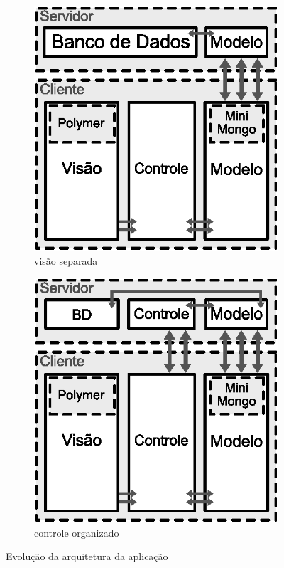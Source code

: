 \begin{figure}[h!]
	\begin{subfigure}{.34\textwidth}
  		\centering
  		\includegraphics[width=.9\linewidth]{figuras/arquitetura3.eps}
  		\caption{visão separada}
  		\label{fig:subarq3}
	\end{subfigure}%
	\begin{subfigure}{.34\textwidth}
  		\centering
  		\includegraphics[width=.9\linewidth]{figuras/arquitetura4.eps}
  		\caption{controle organizado}
  		\label{fig:subarq4}
	\end{subfigure}
	\caption{Evolução da arquitetura da aplicação}
	\label{fig:arquitetura}
\end{figure}

